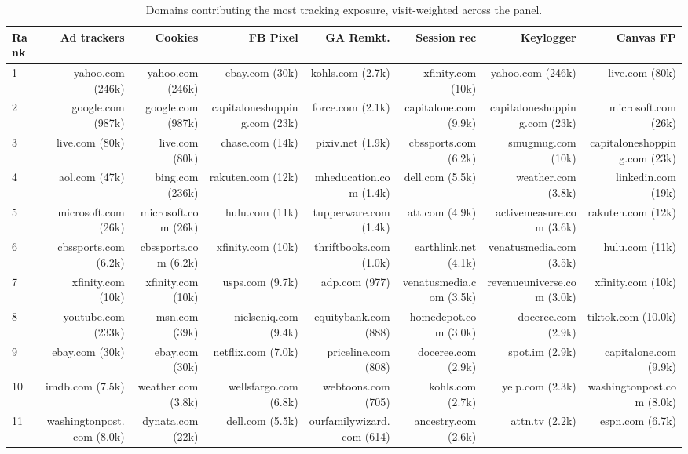 \begin{table}[htbp]
\centering
\caption{Domains contributing the most tracking exposure, visit-weighted across the panel.}
\label{tab:bl_top_contributors_domain}
\begin{adjustbox}{max width=\textwidth}
\begin{tabular}{lrrrrrrr}
\toprule
Rank & Ad trackers & Cookies & FB Pixel & GA Remkt. & Session rec & Keylogger & Canvas FP \\
\midrule
1 & yahoo.com (246k) & yahoo.com (246k) & ebay.com (30k) & kohls.com (2.7k) & xfinity.com (10k) & yahoo.com (246k) & live.com (80k) \\
2 & google.com (987k) & google.com (987k) & capitaloneshopping.com (23k) & force.com (2.1k) & capitalone.com (9.9k) & capitaloneshopping.com (23k) & microsoft.com (26k) \\
3 & live.com (80k) & live.com (80k) & chase.com (14k) & pixiv.net (1.9k) & cbssports.com (6.2k) & smugmug.com (10k) & capitaloneshopping.com (23k) \\
4 & aol.com (47k) & bing.com (236k) & rakuten.com (12k) & mheducation.com (1.4k) & dell.com (5.5k) & weather.com (3.8k) & linkedin.com (19k) \\
5 & microsoft.com (26k) & microsoft.com (26k) & hulu.com (11k) & tupperware.com (1.4k) & att.com (4.9k) & activemeasure.com (3.6k) & rakuten.com (12k) \\
6 & cbssports.com (6.2k) & cbssports.com (6.2k) & xfinity.com (10k) & thriftbooks.com (1.0k) & earthlink.net (4.1k) & venatusmedia.com (3.5k) & hulu.com (11k) \\
7 & xfinity.com (10k) & xfinity.com (10k) & usps.com (9.7k) & adp.com (977) & venatusmedia.com (3.5k) & revenueuniverse.com (3.0k) & xfinity.com (10k) \\
8 & youtube.com (233k) & msn.com (39k) & nielseniq.com (9.4k) & equitybank.com (888) & homedepot.com (3.0k) & doceree.com (2.9k) & tiktok.com (10.0k) \\
9 & ebay.com (30k) & ebay.com (30k) & netflix.com (7.0k) & priceline.com (808) & doceree.com (2.9k) & spot.im (2.9k) & capitalone.com (9.9k) \\
10 & imdb.com (7.5k) & weather.com (3.8k) & wellsfargo.com (6.8k) & webtoons.com (705) & kohls.com (2.7k) & yelp.com (2.3k) & washingtonpost.com (8.0k) \\
11 & washingtonpost.com (8.0k) & dynata.com (22k) & dell.com (5.5k) & ourfamilywizard.com (614) & ancestry.com (2.6k) & attn.tv (2.2k) & espn.com (6.7k) \\

\end{tabular}
\end{adjustbox}
\end{table}
